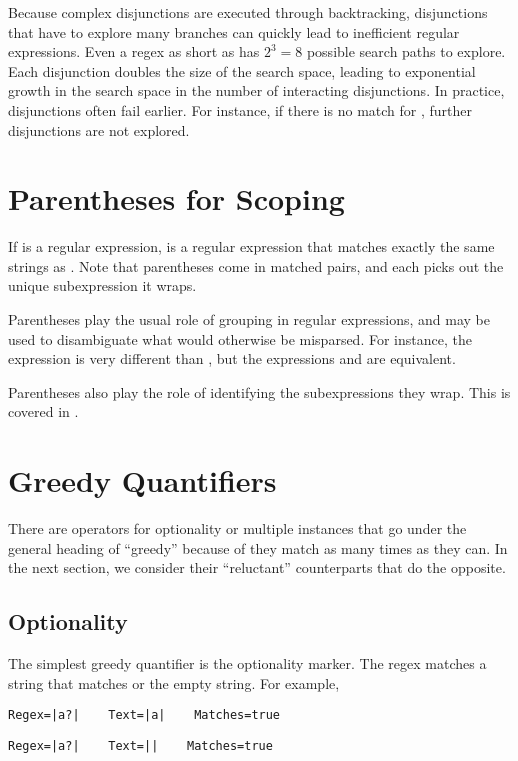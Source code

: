 Because complex disjunctions are executed through backtracking,
disjunctions that have to explore many branches can quickly lead to
inefficient regular expressions.  Even a regex as short as
 has $2^3 = 8$ possible search paths to explore.
Each disjunction doubles the size of the search space, leading to
exponential growth in the search space in the number of interacting
disjunctions.  In practice, disjunctions often fail earlier.  For
instance, if there is no match for , further
disjunctions are not explored.  

\section{Parentheses for Scoping}

If  is a regular expression,  is a
regular expression that matches exactly the same strings as
.  Note that parentheses come in matched pairs, and
each picks out the unique subexpression  it wraps.

Parentheses play the usual role of grouping in regular expressions,
and may be used to disambiguate what would otherwise be misparsed.
For instance, the expression  is very different than
, but the expressions  and
 are equivalent.

Parentheses also play the role of identifying the subexpressions
they wrap.  This is covered in .

\section{Greedy Quantifiers}

There are operators for optionality or multiple instances that go
under the general heading of ``greedy'' because of they match as
many times as they can.  In the next section, we consider their
``reluctant'' counterparts that do the opposite.

\subsection{Optionality}

The simplest greedy quantifier is the optionality marker.  The regex
 matches a string that matches  or the
empty string.  For example,
%
\begin{verbatim}
Regex=|a?|    Text=|a|    Matches=true
\end{verbatim}
%
\begin{verbatim}
Regex=|a?|    Text=||    Matches=true
\end{verbatim}

